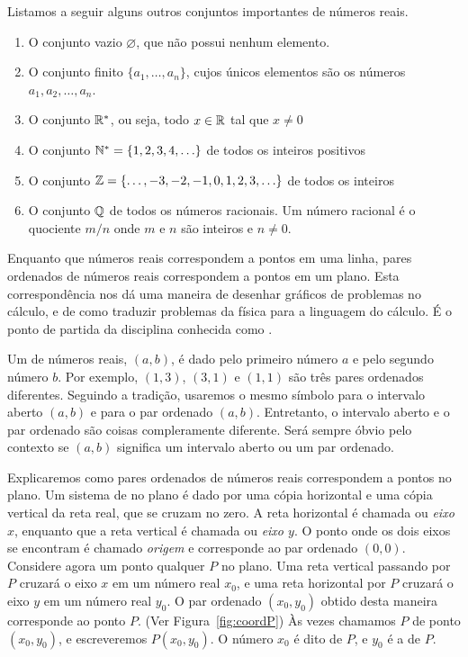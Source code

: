\documentclass{svmono}
\begin{document}
Listamos a seguir alguns outros conjuntos importantes de números reais.

\begin{enumerate}[(1)]
\item O conjunto vazio $\varnothing$, que não possui nenhum elemento.
\item O conjunto finito $\{ a_1, \ldots, a_n \}$, cujos únicos elementos
      são os números $a_1, a_2, \ldots, a_n$.
\item O conjunto $\mathbb{R}^*$, ou seja, todo $x \in \mathbb{R}$ tal que $x \ne 0$
\item O conjunto $\mathbb{N}^* = \{ 1, 2, 3, 4, \ldots \}$ de todos os
      inteiros positivos%
\item O conjunto $\mathbb{Z} = \{ \ldots, -3, -2, -1, 0, 1, 2, 3, \ldots \}$
      de todos os inteiros
\item O conjunto $\mathbb{Q}$ de todos os números racionais. Um número
      racional é o quociente $m/n$ onde $m$ e $n$ são inteiros e $n \ne 0$.
\end{enumerate}

Enquanto que números reais correspondem a pontos em uma linha, pares
ordenados de números reais correspondem a pontos em um plano. Esta
correspondência nos dá uma maneira de desenhar gráficos de problemas
no cálculo, e de como traduzir problemas da física para a linguagem do
cálculo. É o ponto de partida da disciplina conhecida como
.

Um  de números reais, $( a,b )$, é dado
pelo primeiro número $a$ e pelo segundo número $b$. Por exemplo, $( 1,3 )$, $( 3,1 )$ e $( 1,1 )$ são três pares ordenados
diferentes. Seguindo a tradição, usaremos o mesmo símbolo para o intervalo
aberto $(a,b)$ e para o par ordenado $(a, b)$. Entretanto, o intervalo
aberto e o par ordenado são coisas compleramente diferente. Será sempre
óbvio pelo contexto se $(a,b)$ significa um intervalo aberto ou
um par ordenado.

Explicaremos como pares ordenados de números reais correspondem a
pontos no plano. Um sistema de  no
plano é dado por uma cópia horizontal e uma cópia vertical da reta
real, que se cruzam no zero. A reta horizontal é chamada  ou \emph{eixo $x$}, enquanto que a reta vertical é chamada
 ou \emph{eixo $y$}. O ponto onde os dois
eixos se encontram é chamado \emph{origem} e corresponde ao par
ordenado $(0,0)$. Considere agora um ponto qualquer $P$ no plano. Uma
reta vertical passando por $P$ cruzará o eixo $x$ em um número real
$x_0$, e uma reta horizontal por $P$ cruzará o eixo $y$ em um número
real $y_0$. O par ordenado $(x_0,y_0)$  obtido desta maneira corresponde
ao ponto $P$. (Ver Figura~\ref{fig:coordP}) Às vezes chamamos $P$ de ponto
$(x_0,y_0)$, e escreveremos $P(x_0,y_0)$. O número $x_0$ é dito
 de $P$, e $y_0$ é a  de $P$.
\end{document}
